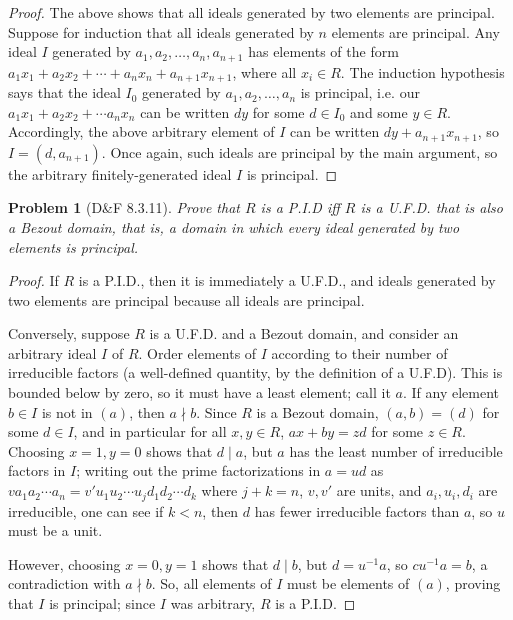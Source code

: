 \documentclass{article}
\newtheorem{plm}{Problem}
\begin{document}
\begin{proof}
  The above shows that all ideals generated by two elements are principal.
  Suppose for induction that all ideals generated by $n$ elements are principal.
  Any ideal $I$ generated by $a_{1}, a_{2}, \ldots, a_{n}, a_{n + 1}$ has elements of the form
  $a_{1}x_{1} + a_{2}x_{2} + \cdots + a_{n}x_{n} + a_{n+1} x_{n+1}$, where all $x_{i} \in R$.
  The induction hypothesis says that the ideal $I_{0}$ generated by $a_{1}, a_{2}, \ldots, a_{n}$ is principal,
  i.e. our $a_{1}x_{1} + a_{2}x_{2} + \cdots a_{n}x_{n}$ can be written $dy$ for some $d \in I_{0}$ and some $y \in R$.
  Accordingly, the above arbitrary element of $I$ can be written $dy + a_{n+1}x_{n+1}$, so $I = (d, a_{n+1})$.
  Once again, such ideals are principal by the main argument, so the arbitrary finitely-generated ideal $I$ is principal.
\end{proof}



\begin{plm}[D\&F 8.3.11]
  Prove that $R$ is a P.I.D iff $R$ is a U.F.D. that is also a Bezout domain, that is,
  a domain in which every ideal generated by two elements is principal.
\end{plm}

\begin{proof}
  If $R$ is a P.I.D., then it is immediately a U.F.D., and ideals generated by two elements are principal because all ideals are principal.

  Conversely, suppose $R$ is a U.F.D. and a Bezout domain, and consider an arbitrary ideal $I$ of $R$.
  Order elements of $I$ according to their number of irreducible factors (a well-defined quantity, by the definition of a U.F.D).
  This is bounded below by zero, so it must have a least element; call it $a$.
  If any element $b \in I$ is not in $(a)$, then $a \nmid b$.
  Since $R$ is a Bezout domain, $(a, b) = (d)$ for some $d \in I$, and in particular for all $x, y \in R$, $ax + by = zd$ for some $z \in R$.
  Choosing $x = 1, y = 0$ shows that $d \mid a$, but $a$ has the least number of irreducible factors in $I$;
  writing out the prime factorizations in $a = ud$ as $va_{1}a_{2} \cdots a_{n} = v'u_{1}u_{2} \cdots u_{j}d_{1}d_{2} \cdots d_{k}$ where $j + k = n$,
  $v, v'$ are units, and $a_{i}, u_{i}, d_{i}$ are irreducible, one can see if $k < n$, then $d$ has fewer irreducible factors than $a$,
  so $u$ must be a unit.

  However, choosing $x = 0, y = 1$ shows that $d \mid b$, but $d = u^{-1}a$, so $cu^{-1}a = b$, a contradiction with $a \nmid b$.
  So, all elements of $I$ must be elements of $(a)$, proving that $I$ is principal; since $I$ was arbitrary, $R$ is a P.I.D.
\end{proof}
\end{document}
